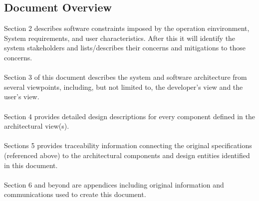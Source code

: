 \documentclass[letterpaper]{article}
\begin{document}
\subsection{Document Overview}
Section 2 describes software constraints imposed by the operation einvironment, System requirements, and user characteristics. After this it will identify the system stakeholders and lists/describes their concerns and mitigations to those concerns. \\
\\
Section 3 of this document describes the system and software
architecture from several viewpoints, including, but not limited to,
the developer{\textquoteright}s view and the user{\textquoteright}s
view.\\
\\
Section 4 provides detailed design descriptions for every component
defined in the architectural view(s). \\
\\
Sections 5 provides traceability information connecting the original specifications
(referenced above) to the architectural components and design entities identified in this document.\\
\\
Section 6 and beyond are appendices including original information and communications used to create this document.
\end{document}
